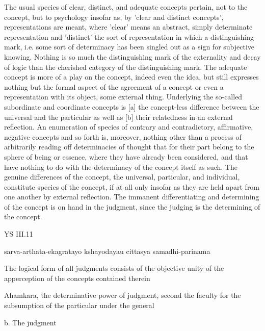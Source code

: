 The usual species of clear, distinct, and adequate concepts pertain,
not to the concept, but to psychology insofar as,
by 'clear and distinct concepts', representations are meant,
where 'clear' means an abstract, simply determinate representation and
'distinct' the sort of representation in which a distinguishing mark,
i.e. some sort of determinacy has been singled out as
a sign for subjective knowing.
Nothing is so much the distinguishing mark of the externality and
decay of logic than the cherished category of the distinguishing mark.
The adequate concept is more of a play on the concept,
indeed even the idea, but still expresses nothing but
the formal aspect of the agreement of a concept or
even a representation with its object, some external thing.
Underlying the so-called subordinate and coordinate concepts is
[a] the concept-less difference between the universal and the particular
as well as [b] their relatedness in an external reflection.
An enumeration of species of contrary and contradictory,
affirmative, negative concepts and so forth is, moreover, nothing other than a
process of arbitrarily reading off determinacies of thought that
for their part belong to the sphere of being or essence,
where they have already been considered, and that have nothing to do
with the determinacy of the concept itself as such.
The genuine differences of the concept,
the universal, particular, and individual,
constitute species of the concept, if at all only insofar as
they are held apart from one another by external reflection.
The immanent differentiating and determining of
the concept is on hand in the judgment,
since the judging is the determining of the concept.

YS III.11

sarva-arthata-ekagratayo kshayodayau cittasya samadhi-parinama

The logical form of all judgments consists of the objective unity of
the apperception of the concepts contained therein

Ahamkara, the determinative power of judgment,
second the faculty for the subsumption of the particular under the general

b. The judgment

